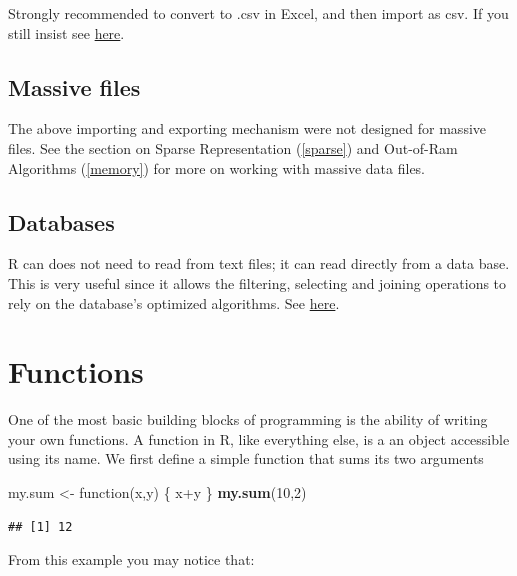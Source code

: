\documentclass[]{book}
\newenvironment{Shaded}{\begin{snugshade}}{\end{snugshade}}
\newcommand{\KeywordTok}[1]{\textcolor[rgb]{0.13,0.29,0.53}{\textbf{{#1}}}}
\newcommand{\DecValTok}[1]{\textcolor[rgb]{0.00,0.00,0.81}{{#1}}}
\newcommand{\StringTok}[1]{\textcolor[rgb]{0.31,0.60,0.02}{{#1}}}
\newcommand{\NormalTok}[1]{{#1}}
\theoremstyle{definition}
\theoremstyle{definition}
\theoremstyle{remark}
\begin{document}
Strongly recommended to convert to .csv in Excel, and then import as
csv. If you still insist see
\href{http://cran.r-project.org/doc/manuals/R-data.html\#Reading-Excel-spreadsheets}{here}.

\subsection{Massive files}\label{massive-files}

The above importing and exporting mechanism were not designed for
massive files. See the section on Sparse Representation (\ref{sparse})
and Out-of-Ram Algorithms (\ref{memory}) for more on working with
massive data files.

\subsection{Databases}\label{databases}

R can does not need to read from text files; it can read directly from a
data base. This is very useful since it allows the filtering, selecting
and joining operations to rely on the database's optimized algorithms.
See
\href{https://rforanalytics.wordpress.com/useful-links-for-r/odbc-databases-for-r/}{here}.

\section{Functions}\label{functions}

One of the most basic building blocks of programming is the ability of
writing your own functions. A function in R, like everything else, is a
an object accessible using its name. We first define a simple function
that sums its two arguments

\begin{Shaded}
\begin{Highlighting}[]
\NormalTok{my.sum <-}\StringTok{ }\NormalTok{function(x,y) \{}
  \NormalTok{x+y}
\NormalTok{\}}
\KeywordTok{my.sum}\NormalTok{(}\DecValTok{10}\NormalTok{,}\DecValTok{2}\NormalTok{)}
\end{Highlighting}
\end{Shaded}

\begin{verbatim}
## [1] 12
\end{verbatim}

From this example you may notice that:
\end{document}
